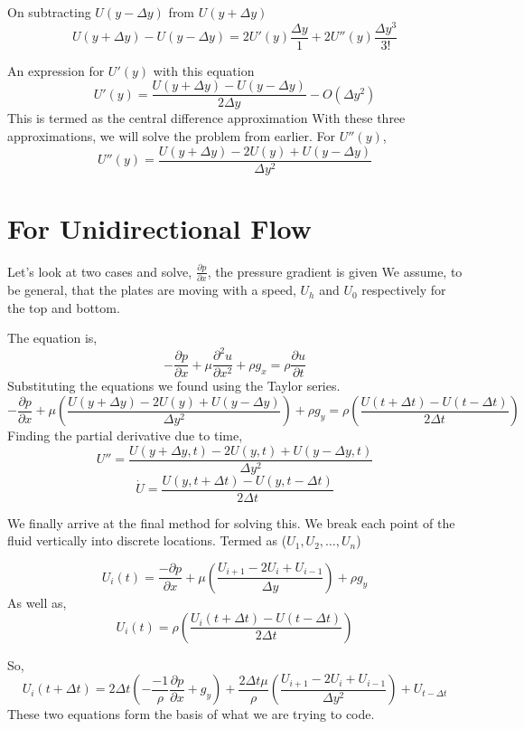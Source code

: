 \documentclass{report}
\begin{document}
On subtracting $U(y-\Delta y)$ from $U(y+\Delta y)$
\[
  U(y + \Delta y) - U(y - \Delta y) = 2 U'(y) \frac{\Delta y}{1} + 2U''(y)\frac{\Delta y^3}{3!}
\]

An expression for $U'(y)$ with this equation
\[
  U'(y) = \frac{U(y + \Delta y) - U(y - \Delta y)}{2 \Delta y} - O(\Delta y^2) 
\]
This is termed as the central difference approximation
With these three approximations, we will solve the problem from earlier.
For $U''(y)$,
\[
U''(y) = \frac{U(y+\Delta y) - 2U(y) + U(y-\Delta y)}{\Delta y^2}
\]

\section{For Unidirectional Flow}
Let's look at two cases and solve,
  $\frac{\partial p}{\partial x}$, the pressure gradient is given
    We assume, to be general, that the plates are moving with a speed, $U_h$ and $U_0$ respectively for the top and bottom.

    The equation is,
    \[
      -\frac{\partial p}{\partial x} + \mu \frac{\partial^2 u}{\partial x^2} + \rho g_x = \rho \frac{\partial u}{\partial t}
    \]
    Substituting the equations we found using the Taylor series.
    \[
      -\frac{\partial p}{\partial x} + \mu(\frac{U(y+\Delta y) - 2U(y) + U(y-\Delta y)}{\Delta y^2}) + \rho g_y = \rho(\frac{U(t + \Delta t) - U(t-\Delta t)}{2\Delta t})
    \]
    Finding the partial derivative due to time,
    \[
      U'' = \frac{U(y+\Delta y, t)-2U(y,t) + U(y-\Delta y, t)}{\Delta y^2}
    \]
    \[
      \dot{U} = \frac{U(y, t+ \Delta t) - U(y,t - \Delta t)}{2\Delta t}
    \]

    We finally arrive at the final method for solving this. We break each point of the fluid vertically into discrete locations. Termed as ($U_1, U_2,\dots, U_n$)

    \[
      U_i(t) = \frac{-\partial p}{\partial x} + \mu(\frac{U_{i+1} - 2U_{i} + U_{i-1}}{\Delta y}) + \rho g_y
    \]
    As well as,
    \[
      U_i(t) = \rho(\frac{U_i(t + \Delta t)-U(t-\Delta t)}{2\Delta t})
    \]

    So,
    \[
    U_{i}(t+\Delta t) = 2\Delta t (-\frac{-1}{\rho} \frac{\partial p}{\partial x} + g_y) + \frac{2 \Delta t \mu}{\rho}(\frac{U_{i+1} - 2U_i + U_{i-1}}{\Delta y^2}) + U_{t - \Delta t}
    \]
  These two equations form the basis of what we are trying to code.
\end{document}
